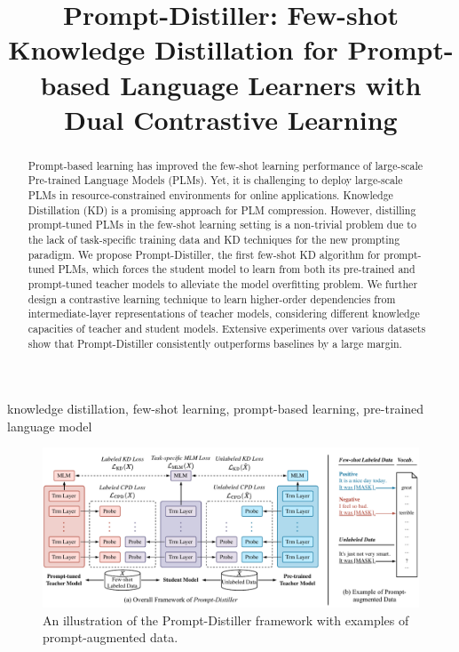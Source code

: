 \documentclass{article}
\title{Prompt-Distiller: Few-shot Knowledge Distillation for Prompt-based Language Learners with Dual Contrastive Learning}
\begin{document}
\maketitle

\begin{abstract}
	Prompt-based learning has improved the few-shot learning performance of large-scale Pre-trained Language Models (PLMs). Yet, it is challenging to deploy large-scale PLMs in resource-constrained environments for online applications. Knowledge Distillation (KD) is a promising approach for PLM compression. However, distilling prompt-tuned PLMs in the few-shot learning setting is a non-trivial problem due to the lack of task-specific training data and KD techniques for the new prompting paradigm.
	We propose Prompt-Distiller, the first few-shot KD algorithm for prompt-tuned PLMs, which forces the student model to learn from both its pre-trained and prompt-tuned teacher models to alleviate the model overfitting problem.
	We further design a contrastive learning technique to learn higher-order dependencies from intermediate-layer representations of teacher models, considering different knowledge capacities of teacher and student models.
	Extensive experiments over various datasets show that Prompt-Distiller consistently outperforms baselines by a large margin.
\end{abstract}
%
\begin{keywords}
	knowledge distillation, few-shot learning, prompt-based learning, pre-trained language model
\end{keywords}
%

\begin{figure}[t]
	\centering
	\includegraphics[width=\linewidth]{framework.pdf}
	\caption{An illustration of the Prompt-Distiller framework with examples of prompt-augmented data.}
	\label{fig:overview}
\end{figure}
\end{document}
